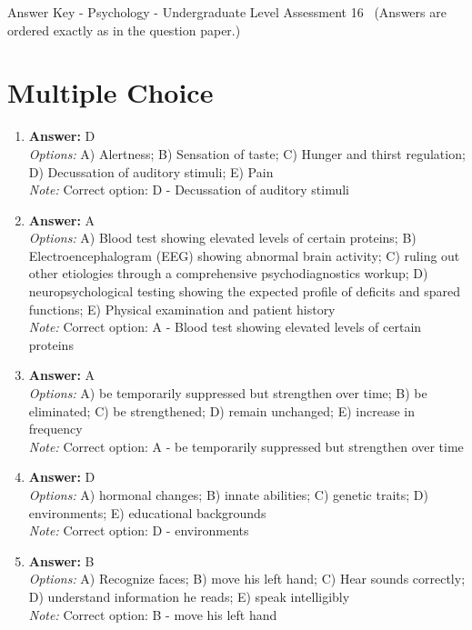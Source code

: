 \documentclass[12pt]{article}
\begin{document}
\begin{center}
Answer Key - Psychology - Undergraduate Level Assessment 16 \
\small (Answers are ordered exactly as in the question paper.)
\end{center}

\section*{Multiple Choice}
\begin{enumerate}[label=\arabic*.]
\item \textbf{Answer:} D
\\ \textit{Options:} A) Alertness; B) Sensation of taste; C) Hunger and thirst regulation; D) Decussation of auditory stimuli; E) Pain
\\ \textit{Note:} Correct option: D - Decussation of auditory stimuli
\item \textbf{Answer:} A
\\ \textit{Options:} A) Blood test showing elevated levels of certain proteins; B) Electroencephalogram (EEG) showing abnormal brain activity; C) ruling out other etiologies through a comprehensive psychodiagnostics workup; D) neuropsychological testing showing the expected profile of deficits and spared functions; E) Physical examination and patient history
\\ \textit{Note:} Correct option: A - Blood test showing elevated levels of certain proteins
\item \textbf{Answer:} A
\\ \textit{Options:} A) be temporarily suppressed but strengthen over time; B) be eliminated; C) be strengthened; D) remain unchanged; E) increase in frequency
\\ \textit{Note:} Correct option: A - be temporarily suppressed but strengthen over time
\item \textbf{Answer:} D
\\ \textit{Options:} A) hormonal changes; B) innate abilities; C) genetic traits; D) environments; E) educational backgrounds
\\ \textit{Note:} Correct option: D - environments
\item \textbf{Answer:} B
\\ \textit{Options:} A) Recognize faces; B) move his left hand; C) Hear sounds correctly; D) understand information he reads; E) speak intelligibly
\\ \textit{Note:} Correct option: B - move his left hand
\end{enumerate}
\end{document}
